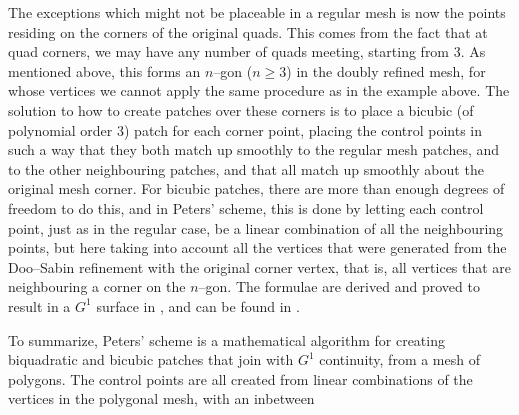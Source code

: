 
The exceptions which might not be placeable in a regular mesh is now the points residing on the corners of the original quads. This comes from the fact that at quad corners, we may have any number of quads meeting, starting from 3.  As mentioned above, this forms an $n$--gon ($n \geq 3$) in the doubly refined mesh, for whose vertices we cannot apply the same procedure as in the example above. 
The solution to how to create \Bez patches over these corners is to place a bicubic (of polynomial order 3) \Bez patch for each corner point, placing the \Bez control points in such a way that they both match up smoothly to the regular mesh patches, and to the other neighbouring patches, and that all match up smoothly about the original mesh corner. For bicubic \Bez patches, there are more than enough degrees of freedom to do this, and in Peters' scheme, this is done by letting each \Bez control point, just as in the regular case, be a linear combination of all the neighbouring points, but here taking into account all the vertices that were generated from the Doo--Sabin refinement with the original corner vertex, that is, all vertices that are neighbouring a corner on the $n$--gon. The formulae are derived and proved to result in a $G^1$ surface in \cite{peters1992constructing}, and can be found in . 

To summarize, Peters' scheme is a mathematical algorithm for creating biquadratic and bicubic \Bez patches that join with $G^1$ continuity, from a mesh of polygons. The \Bez control points are all created from linear combinations of the vertices in the polygonal mesh, with an inbetween

